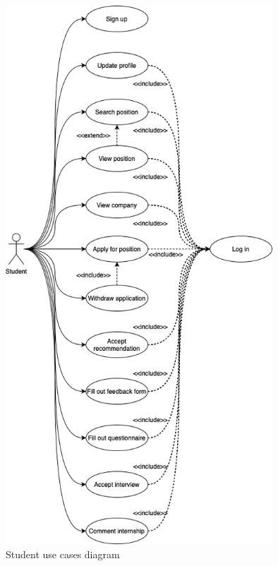 \begin{figure}[h]
   \centering    \includegraphics[width=10cm]{images/use-case-diagrams/student.png}
    \caption{Student use cases diagram}
\end{figure}

